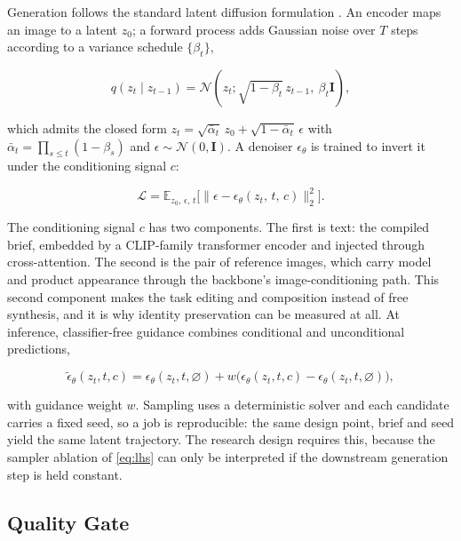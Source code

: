 \documentclass[conference]{IEEEtran}
\begin{document}
Generation follows the standard latent diffusion formulation
\cite{ho2020ddpm,rombach2022ldm}. An encoder maps an image to a latent
$z_0$; a forward process adds Gaussian noise over $T$ steps according to a variance
schedule $\{\beta_t\}$,

\begin{equation}
q(z_t \mid z_{t-1}) = \mathcal{N}\!\left(z_t; \sqrt{1-\beta_t}\, z_{t-1},\ \beta_t \mathbf{I}\right),
\label{eq:forward}
\end{equation}

which admits the closed form $z_t = \sqrt{\bar\alpha_t}\, z_0 + \sqrt{1-\bar\alpha_t}\,\epsilon$
with $\bar\alpha_t = \prod_{s\le t}(1-\beta_s)$ and $\epsilon \sim \mathcal{N}(0,\mathbf{I})$.
A denoiser $\epsilon_\theta$ is trained to invert it under the conditioning signal
$c$:

\begin{equation}
\mathcal{L} = \mathbb{E}_{z_0,\, \epsilon,\, t}
\Big[\big\lVert \epsilon - \epsilon_\theta(z_t,\, t,\, c) \big\rVert_2^2 \Big].
\label{eq:objective}
\end{equation}

The conditioning signal $c$ has two components. The first is text: the compiled
brief, embedded by a CLIP-family transformer encoder
\cite{radford2021clip,zhai2023siglip} and injected through cross-attention. The
second is the pair of reference images, which carry model and product appearance
through the backbone's image-conditioning path. This second component makes the task
editing and composition instead of free synthesis, and it is why identity
preservation can be measured at all. At inference, classifier-free guidance
\cite{ho2022cfg} combines conditional and unconditional predictions,

\begin{equation}
\tilde\epsilon_\theta(z_t, t, c) = \epsilon_\theta(z_t, t, \varnothing)
+ w\big(\epsilon_\theta(z_t, t, c) - \epsilon_\theta(z_t, t, \varnothing)\big),
\label{eq:cfg}
\end{equation}

with guidance weight $w$. Sampling uses a deterministic solver \cite{song2021ddim}
and each candidate carries a fixed seed, so a job is reproducible: the same design
point, brief and seed yield the same latent trajectory. The research design requires
this, because the sampler ablation of \eqref{eq:lhs} can only be interpreted if the
downstream generation step is held constant.

\subsection{Quality Gate}
\label{sec:gate}
\end{document}

